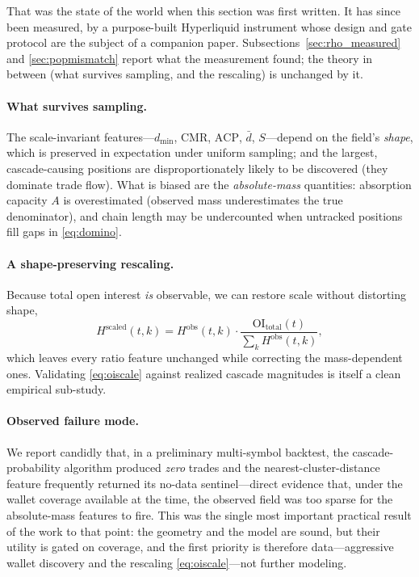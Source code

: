 \documentclass[11pt,a4paper]{article}
\theoremstyle{definition}
\theoremstyle{plain}
\begin{document}
That was the state of the world when this section was first written. It has since been measured, by
a purpose-built Hyperliquid instrument whose design and gate protocol are the subject of a companion
paper. Subsections~\ref{sec:rho_measured} and \ref{sec:popmismatch} report what the measurement
found; the theory in between (what survives sampling, and the rescaling) is unchanged by it.

\paragraph{What survives sampling.} The scale-invariant features---$d_{\min}$, $\mathrm{CMR}$,
$\mathrm{ACP}$, $\bar d$, $S$---depend on the field's \emph{shape}, which is preserved in
expectation under uniform sampling; and the largest, cascade-causing positions are
disproportionately likely to be discovered (they dominate trade flow). What is biased are the
\emph{absolute-mass} quantities: absorption capacity $A$ is overestimated (observed mass
underestimates the true denominator), and chain length may be undercounted when untracked positions
fill gaps in \eqref{eq:domino}.

\paragraph{A shape-preserving rescaling.} Because total open interest \emph{is} observable, we can
restore scale without distorting shape,
\begin{equation}
  H^{\text{scaled}}(t,k) = H^{\text{obs}}(t,k)\cdot
       \frac{\mathrm{OI}_{\text{total}}(t)}{\sum_k H^{\text{obs}}(t,k)},
  \label{eq:oiscale}
\end{equation}
which leaves every ratio feature unchanged while correcting the mass-dependent ones. Validating
\eqref{eq:oiscale} against realized cascade magnitudes is itself a clean empirical sub-study.

\paragraph{Observed failure mode.} We report candidly that, in a preliminary multi-symbol backtest,
the cascade-probability algorithm produced \emph{zero} trades and the nearest-cluster-distance
feature frequently returned its no-data sentinel---direct evidence that, under the wallet coverage
available at the time, the observed field was too sparse for the absolute-mass features to fire.
This was the single most important practical result of the work to that point: the geometry and the
model are sound, but their utility is gated on coverage, and the first priority is therefore
data---aggressive wallet discovery and the rescaling \eqref{eq:oiscale}---not further modeling.
\end{document}
